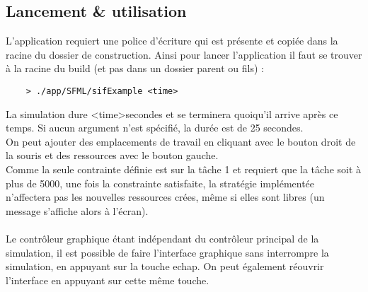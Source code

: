 \subsection{Lancement \& utilisation}

L'application requiert une police d'écriture qui est présente et copiée dans la racine du dossier de construction. Ainsi pour lancer l'application il faut se trouver à la racine du build (et pas dans un dossier parent ou fils) :

\begin{verbatim}
    > ./app/SFML/sifExample <time>
\end{verbatim}

La simulation dure \textless time\textgreater secondes et se terminera quoiqu'il arrive après ce temps. Si aucun argument n'est spécifié, la durée est de 25 secondes.\\
On peut ajouter des emplacements de travail en cliquant avec le bouton droit de la souris et des ressources avec le bouton gauche.\\
Comme la seule contrainte définie est sur la tâche 1 et requiert que la tâche soit à plus de 5000, une fois la constrainte satisfaite, la stratégie implémentée n'affectera pas les nouvelles ressources crées, même si elles sont libres (un message s'affiche alors à l'écran).\\\\

Le contrôleur graphique étant indépendant du contrôleur principal de la simulation, il est possible de faire l'interface graphique sans interrompre la simulation, en appuyant sur la touche echap. On peut également réouvrir l'interface en appuyant sur cette même touche.

